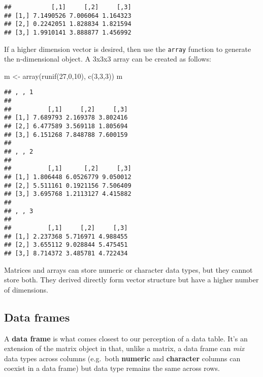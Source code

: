 \documentclass[
]{article}
\newenvironment{Shaded}{\begin{snugshade}}{\end{snugshade}}
\newcommand{\DecValTok}[1]{\textcolor[rgb]{0.00,0.00,0.81}{#1}}
\newcommand{\FunctionTok}[1]{\textcolor[rgb]{0.00,0.00,0.00}{#1}}
\newcommand{\NormalTok}[1]{#1}
\newcommand{\OtherTok}[1]{\textcolor[rgb]{0.56,0.35,0.01}{#1}}
\begin{document}
\begin{verbatim}
##           [,1]     [,2]     [,3]
## [1,] 7.1490526 7.006064 1.164323
## [2,] 0.2242051 1.828834 1.821594
## [3,] 1.9910141 3.888877 1.456992
\end{verbatim}

If a higher dimension vector is desired, then use the \texttt{array}
function to generate the n-dimensional object. A 3x3x3 array can be
created as follows:

\begin{Shaded}
\begin{Highlighting}[]
\NormalTok{m }\OtherTok{\textless{}{-}} \FunctionTok{array}\NormalTok{(}\FunctionTok{runif}\NormalTok{(}\DecValTok{27}\NormalTok{,}\DecValTok{0}\NormalTok{,}\DecValTok{10}\NormalTok{), }\FunctionTok{c}\NormalTok{(}\DecValTok{3}\NormalTok{,}\DecValTok{3}\NormalTok{,}\DecValTok{3}\NormalTok{))}
\NormalTok{m}
\end{Highlighting}
\end{Shaded}

\begin{verbatim}
## , , 1
## 
##          [,1]     [,2]     [,3]
## [1,] 7.689793 2.169378 3.802416
## [2,] 6.477589 3.569118 1.805694
## [3,] 6.151268 7.848788 7.600159
## 
## , , 2
## 
##          [,1]      [,2]     [,3]
## [1,] 1.806448 6.0526779 9.050012
## [2,] 5.511161 0.1921156 7.506409
## [3,] 3.695768 1.2113127 4.415882
## 
## , , 3
## 
##          [,1]     [,2]     [,3]
## [1,] 2.237368 5.716971 4.988455
## [2,] 3.655112 9.028844 5.475451
## [3,] 8.714372 3.485781 4.722434
\end{verbatim}

Matrices and arrays can store numeric or character data types, but they
cannot store both. They derived directly form vector structure but have
a higher number of dimensions.

\hypertarget{data-frames}{%
\subsection{Data frames}\label{data-frames}}

A \textbf{data frame} is what comes closest to our perception of a data
table. It's an extension of the matrix object in that, unlike a matrix,
a data frame can \emph{mix} data types across columns (e.g.~both
\textbf{numeric} and \textbf{character} columns can coexist in a data
frame) but data type remains the same across rows.
\end{document}
